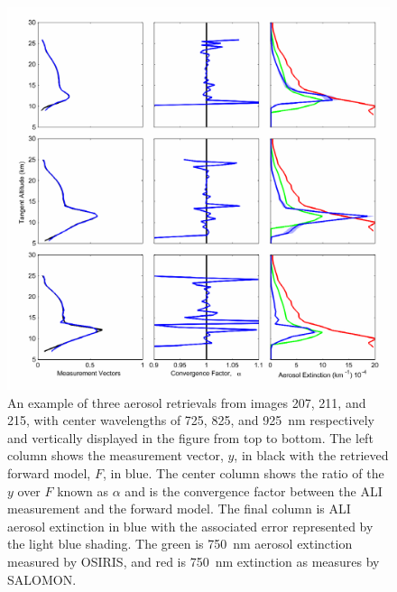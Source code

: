 \documentclass[12pt]{article}
\begin{document}
\begin{figure}
\includegraphics[width=1.0\textwidth]{./Images/AliRetreivals.pdf}
    \caption{An example of three aerosol retrievals from images 207, 211, and 215, with center wavelengths of 725, 825, and 925~nm respectively and vertically displayed in the figure from top to bottom. The left column shows the measurement vector, $y$, in black with the retrieved forward model, $F$, in blue. The center column shows the ratio of the $y$ over $F$ known as $\alpha$ and is the convergence factor between the ALI measurement and the forward model. The final column is ALI aerosol extinction in blue with the associated error represented by the light blue shading. The green is 750~nm aerosol extinction measured by OSIRIS, and red is 750~nm extinction as measures by SALOMON.}
    \label{fig:AliRetreivals}
\end{figure}

\newpage
\end{document}

